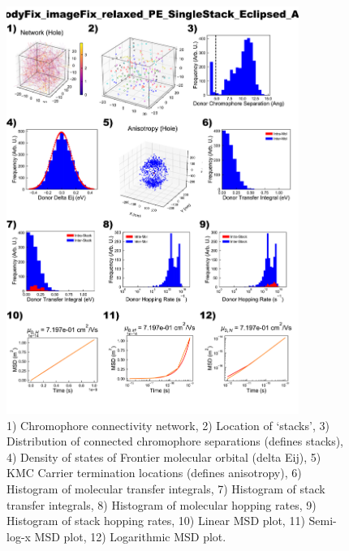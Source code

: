 \documentclass[12pt]{article}
\begin{document}
\begin{figure}[h]\centering
	\includegraphics[width=0.85\textwidth]{Figures/bodyFix_imageFix_relaxed_PE_SingleStack_Eclipsed_AA.png}
    \caption{   1) Chromophore connectivity network, 
                2) Location of `stacks', 
                3) Distribution of connected chromophore separations (defines stacks),
                4) Density of states of Frontier molecular orbital (delta Eij),
                5) KMC Carrier termination locations (defines anisotropy),
                6) Histogram of molecular transfer integrals,
                7) Histogram of stack transfer integrals,
                8) Histogram of molecular hopping rates,
                9) Histogram of stack hopping rates,
                10) Linear MSD plot,
                11) Semi-log-x MSD plot,
                12) Logarithmic MSD plot.}
	\label{fig:PESingEcl}
\end{figure}
\end{document}
